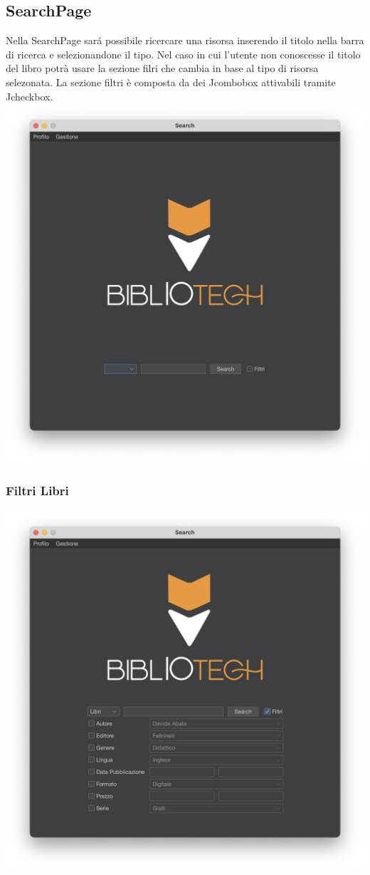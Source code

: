 \subsection{SearchPage}
Nella SearchPage sar\'a possibile ricercare una risorsa inserendo il titolo nella barra di ricerca e selezionandone il
tipo. Nel caso in cui l'utente non conoscesse il titolo del libro potrà usare la sezione filri che cambia in base al
tipo di risorsa selezonata.
La sezione filtri è composta da dei Jcombobox attivabili tramite Jcheckbox.
\includegraphics[scale=0.25, center]{Immagini/Schermate/Search/SearchPage.png}
\subsubsection{Filtri Libri}
\includegraphics[scale=0.25, center]{Immagini/Schermate/Search/SearchPage-FiltriLibro.png}

